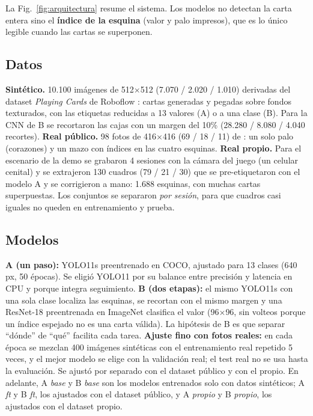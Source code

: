 \documentclass[conference,a4paper]{IEEEtran}
\begin{document}
La Fig.~\ref{fig:arquitectura} resume el sistema. Los modelos no detectan la carta entera sino el \textbf{índice de
la esquina} (valor y palo impresos), que es lo único legible cuando las cartas se superponen.

\subsection{Datos}
\textbf{Sintético.} 10.100 imágenes de 512$\times$512 (7.070 / 2.020 / 1.010) derivadas del dataset \emph{Playing
Cards} de Roboflow \cite{roboflowcards}: cartas generadas y pegadas sobre fondos texturados, con las etiquetas
reducidas a 13 valores (A) o a una clase (B). Para la CNN de B se recortaron las cajas con un margen del 10\%
(28.280 / 8.080 / 4.040 recortes).
\textbf{Real público.} 98 fotos de 416$\times$416 (69 / 18 / 11) de \cite{kostadinov2024}: un solo palo (corazones) y
un mazo con índices en las cuatro esquinas.
\textbf{Real propio.} Para el escenario de la demo se grabaron 4 sesiones con la cámara del juego (un celular cenital)
y se extrajeron 130 cuadros (79 / 21 / 30) que se pre-etiquetaron con el modelo A y se corrigieron a mano: 1.688
esquinas, con muchas cartas superpuestas. Los conjuntos se separaron \emph{por sesión}, para que cuadros casi iguales
no queden en entrenamiento y prueba.

\subsection{Modelos}
\textbf{A (un paso):} YOLO11s \cite{ultralytics2024,khanam2024} preentrenado en COCO, ajustado para 13 clases (640
px, 50 épocas). Se eligió YOLO11 por su balance entre precisión y latencia en CPU y porque integra seguimiento.
\textbf{B (dos etapas):} el mismo YOLO11s con una sola clase localiza las esquinas, se recortan con el mismo margen y
una ResNet-18 \cite{he2016} preentrenada en ImageNet clasifica el valor (96$\times$96, sin volteos porque un índice
espejado no es una carta válida). La hipótesis de B es que separar ``dónde'' de ``qué'' facilita cada tarea.
\textbf{Ajuste fino con fotos reales:} en cada época se mezclan 400 imágenes sintéticas con el entrenamiento real
repetido 5 veces, y el mejor modelo se elige con la validación real; el test real no se usa hasta la evaluación.
Se ajustó por separado con el dataset público y con el propio. En adelante, A \emph{base} y B \emph{base}
son los modelos entrenados solo con datos sintéticos; A \emph{ft} y B \emph{ft}, los ajustados con el dataset
público, y A \emph{propio} y B \emph{propio}, los ajustados con el dataset propio.
\end{document}
